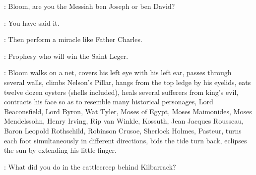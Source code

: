 \Voice:
Bloom,
are you the Messiah ben Joseph or ben David?

\Bloom:
You have said it.

\BrotherBuzz[2]:
Then perform a miracle like Father Charles.

\BantamLyons[2]:
Prophesy who will win the Saint Leger.%

:
Bloom walks on a net,
covers his left eye with his left ear,
passes through several walls,
climbs Nelson's Pillar,
hangs from the top ledge by his eyelids,
eats twelve dozen oysters (shells included),
heals several sufferers from king's evil,
contracts his face so as to resemble many historical personages,
Lord Beaconsfield,
Lord Byron,
Wat Tyler,
Moses of Egypt,
Moses Maimonides,
Moses Mendelssohn,
Henry Irving,
Rip van Winkle,
Kossuth,
Jean Jacques Rousseau,
Baron Leopold Rothschild,
Robinson Crusoe,
Sherlock Holmes,
Pasteur,
turns each foot simultaneously in different directions,
bids the tide turn back,
eclipses the sun by extending his little finger.



\Crab:
What did you do in the cattlecreep behind Kilbarrack?

